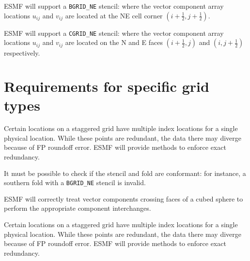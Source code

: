 \newcommand{\bgridne}{\texttt{BGRID\_NE} }
\newcommand{\cgridne}{\texttt{CGRID\_NE} }
\sreq{\bgridne}

ESMF will support a \bgridne stencil: where the vector
component array locations $u_{ij}$ and $v_{ij}$ are located at the NE
cell corner $(i+\frac12,j+\frac12)$.

\sreq{\cgridne}

ESMF will support a \cgridne stencil: where the vector
component array locations $u_{ij}$ and $v_{ij}$ are located on the N
and E faces $(i+\frac12,j)$ and $(i,j+\frac12)$ respectively.

\part{Requirements for specific grid types} \label{DG:gridtypes}



\cite{ref:m1996}



Certain locations on a staggered grid have multiple index locations
for a single physical location. While these points are redundant, the
data there may diverge because of FP roundoff error. ESMF will provide
methods to enforce exact redundancy.


It must be possible to check if the stencil and fold are conformant:
for instance, a southern fold with a \bgridne stencil is
invalid.


\cite{ref:rpm1996}


ESMF will correctly treat vector components crossing faces of a cubed
sphere to perform the appropriate component interchanges.


Certain locations on a staggered grid have multiple index locations
for a single physical location. While these points are redundant, the
data there may diverge because of FP roundoff error. ESMF will provide
methods to enforce exact redundancy.





